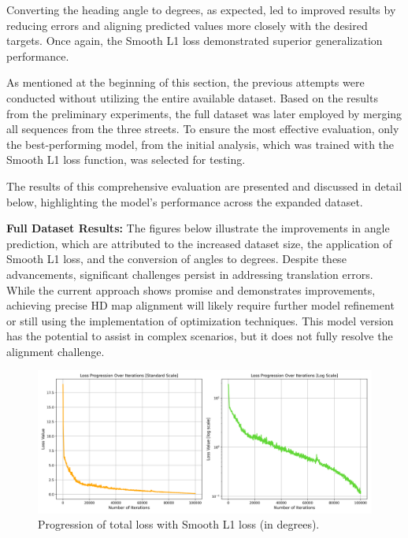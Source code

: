 Converting the heading angle to degrees, as expected, led to improved results by reducing errors and aligning predicted values more closely with the desired targets. Once again, the Smooth L1 loss demonstrated superior generalization performance.

As mentioned at the beginning of this section, the previous attempts were conducted without utilizing the entire available dataset. Based on the results from the preliminary experiments, the full dataset was later employed by merging all sequences from the three streets. To ensure the most effective evaluation, only the best-performing model, from the initial analysis, which was trained with the Smooth L1 loss function, was selected for testing. 

The results of this comprehensive evaluation are presented and discussed in detail below, highlighting the model's performance across the expanded dataset.


\textbf{Full Dataset Results:} The figures below illustrate the improvements in angle prediction, which are attributed to the increased dataset size, the application of Smooth L1 loss, and the conversion of angles to degrees. Despite these advancements, significant challenges persist in addressing translation errors. While the current approach shows promise and demonstrates improvements, achieving precise HD map alignment will likely require further model refinement or still using the implementation of optimization techniques. This model version has the potential to assist in complex scenarios, but it does not fully resolve the alignment challenge.
\begin{figure}[H]
    \centering
    \includegraphics[width=1\linewidth]{loss_total_l1sDEG_progression_comparison.png}
    \caption{Progression of total loss with Smooth L1 loss (in degrees).}
    \label{fig:total-loss-progression}
\end{figure}

